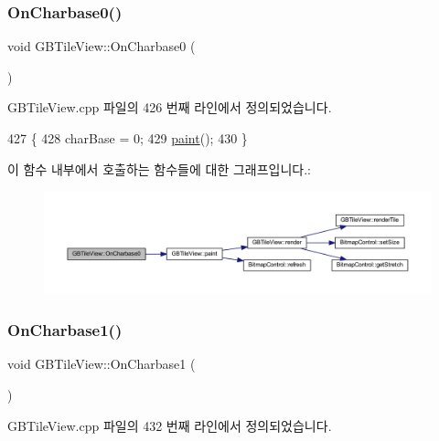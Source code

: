 \subsubsection{\texorpdfstring{On\+Charbase0()}{OnCharbase0()}}
{\footnotesize\ttfamily void G\+B\+Tile\+View\+::\+On\+Charbase0 (\begin{DoxyParamCaption}{ }\end{DoxyParamCaption})\hspace{0.3cm}{\ttfamily [protected]}}



G\+B\+Tile\+View.\+cpp 파일의 426 번째 라인에서 정의되었습니다.


\begin{DoxyCode}
427 \{
428   charBase = 0;
429   \mbox{\hyperlink{class_g_b_tile_view_aa78a471956e777509644a0a04bab2c4d}{paint}}();
430 \}
\end{DoxyCode}
이 함수 내부에서 호출하는 함수들에 대한 그래프입니다.\+:
\nopagebreak
\begin{figure}[H]
\begin{center}
\leavevmode
\includegraphics[width=350pt]{class_g_b_tile_view_afb45c55e706bed1468f547510490fa2a_cgraph}
\end{center}
\end{figure}
\mbox{\label{class_g_b_tile_view_a9d5c6de9e7d359cf221b164f51cb6a18}} 
\subsubsection{\texorpdfstring{On\+Charbase1()}{OnCharbase1()}}
{\footnotesize\ttfamily void G\+B\+Tile\+View\+::\+On\+Charbase1 (\begin{DoxyParamCaption}{ }\end{DoxyParamCaption})\hspace{0.3cm}{\ttfamily [protected]}}



G\+B\+Tile\+View.\+cpp 파일의 432 번째 라인에서 정의되었습니다.


